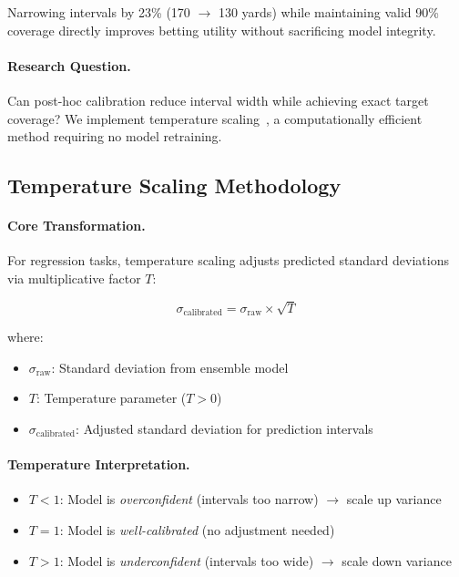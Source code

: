 Narrowing intervals by 23\% (170 $\to$ 130 yards) while maintaining valid 90\% coverage directly improves betting utility without sacrificing model integrity.

\paragraph{Research Question.}
Can post-hoc calibration reduce interval width while achieving exact target coverage? We implement temperature scaling~\cite{guo2017calibration,kuleshov2018accurate}, a computationally efficient method requiring no model retraining.

\subsection{Temperature Scaling Methodology}

\paragraph{Core Transformation.}
For regression tasks, temperature scaling adjusts predicted standard deviations via multiplicative factor $T$:

\begin{equation}
\sigma_{\text{calibrated}} = \sigma_{\text{raw}} \times \sqrt{T}
\label{eq:temperature-scaling}
\end{equation}

where:
\begin{itemize}[itemsep=2pt,parsep=0pt]
    \item $\sigma_{\text{raw}}$: Standard deviation from ensemble model
    \item $T$: Temperature parameter ($T > 0$)
    \item $\sigma_{\text{calibrated}}$: Adjusted standard deviation for prediction intervals
\end{itemize}

\paragraph{Temperature Interpretation.}
\begin{itemize}[itemsep=2pt,parsep=0pt]
    \item $T < 1$: Model is \textit{overconfident} (intervals too narrow) $\to$ scale up variance
    \item $T = 1$: Model is \textit{well-calibrated} (no adjustment needed)
    \item $T > 1$: Model is \textit{underconfident} (intervals too wide) $\to$ scale down variance
\end{itemize}

